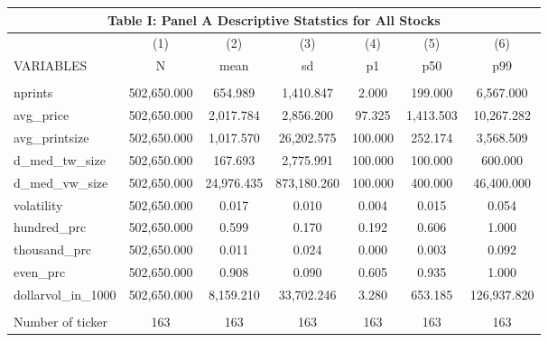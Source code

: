 \documentclass[]{article}
\begin{document}
\begin{tabular}{lcccccc}
\multicolumn{7}{c}{Table I: Panel A Descriptive Statstics for All Stocks} \\ \hline
 & (1) & (2) & (3) & (4) & (5) & (6) \\
VARIABLES & N & mean & sd & p1 & p50 & p99 \\ \hline
 &  &  &  &  &  &  \\
nprints & 502,650.000 & 654.989 & 1,410.847 & 2.000 & 199.000 & 6,567.000 \\
avg\_price & 502,650.000 & 2,017.784 & 2,856.200 & 97.325 & 1,413.503 & 10,267.282 \\
avg\_printsize & 502,650.000 & 1,017.570 & 26,202.575 & 100.000 & 252.174 & 3,568.509 \\
d\_med\_tw\_size & 502,650.000 & 167.693 & 2,775.991 & 100.000 & 100.000 & 600.000 \\
d\_med\_vw\_size & 502,650.000 & 24,976.435 & 873,180.260 & 100.000 & 400.000 & 46,400.000 \\
volatility & 502,650.000 & 0.017 & 0.010 & 0.004 & 0.015 & 0.054 \\
hundred\_prc & 502,650.000 & 0.599 & 0.170 & 0.192 & 0.606 & 1.000 \\
thousand\_prc & 502,650.000 & 0.011 & 0.024 & 0.000 & 0.003 & 0.092 \\
even\_prc & 502,650.000 & 0.908 & 0.090 & 0.605 & 0.935 & 1.000 \\
dollarvol\_in\_1000 & 502,650.000 & 8,159.210 & 33,702.246 & 3.280 & 653.185 & 126,937.820 \\
 &  &  &  &  &  &  \\
 Number of ticker & 163 & 163 & 163 & 163 & 163 & 163 \\ \hline
\end{tabular}
\end{document}
